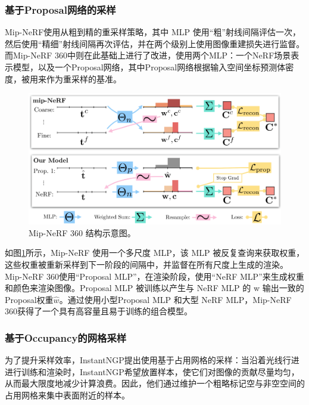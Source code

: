 \subsubsection{基于Proposal网络的采样}
Mip-NeRF\cite{barron_mip-nerf_2021}使用从粗到精的重采样策略，其中 MLP 使用“粗”射线间隔评估一次，然后使用“精细”射线间隔再次评估，并在两个级别上使用图像重建损失进行监督。而Mip-NeRF 360\cite{barron_mip-nerf_2022}中则在此基础上进行了改进，使用两个MLP：一个NeRF场景表示模型，以及一个Proposal网络，其中Proposal网络根据输入空间坐标预测体密度，被用来作为重采样的基准。

\begin{figure}[ht]
    \centering
    \includegraphics[width=\textwidth]{undergraduate-thesis/images/mip-nerf360 proposal network.png}
    \caption{Mip-NeRF 360\cite{barron_mip-nerf_2022} 结构示意图。}
    \label{fig:related-work proposal network}
\end{figure}

如图\ref{fig:related-work proposal network}所示，Mip-NeRF 使用一个多尺度 MLP，该 MLP 被反复查询来获取权重，这些权重被重新采样到下一阶段的间隔中，并监督在所有尺度上生成的渲染。Mip-NeRF 360使用“Proposal MLP”，在渲染阶段，使用“NeRF MLP”来生成权重和颜色来渲染图像。Proposal MLP 被训练以产生与 NeRF MLP 的 w 输出一致的Proposal权重$\hat{w}$。通过使用小型Proposal MLP 和大型 NeRF MLP，Mip-NeRF 360获得了一个具有高容量且易于训练的组合模型。

\subsubsection{基于Occupancy的网格采样}
为了提升采样效率，InstantNGP\cite{muller_instant_2022}提出使用基于占用网格的采样：当沿着光线行进进行训练和渲染时，InstantNGP希望放置样本，使它们对图像的贡献尽量均匀，从而最大限度地减少计算浪费。因此，他们通过维护一个粗略标记空与非空空间的占用网格来集中表面附近的样本。

